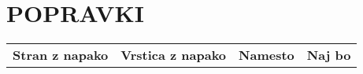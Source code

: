 \chapter*{POPRAVKI}
\thispagestyle{fancy}

\begin{table}[h!]
\begin{tabularx}{\textwidth}{@{}>{\bfseries}p{4cm} @{}>{\bfseries}p{4cm} @{}>{\bfseries}p{4cm} @{}>{\bfseries}p{4cm}}
%
Stran z napako	& Vrstica z napako	& Namesto & Naj bo	 \\
%
\end{tabularx}
\end{table}